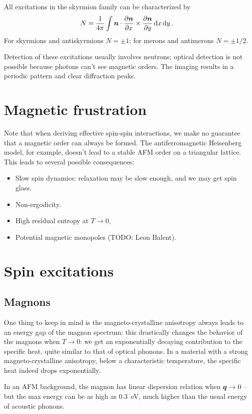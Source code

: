 \documentclass[hyperref, a4paper]{article}
\begin{document}
All excitations in the skyrmion family can be characterized by 
\begin{equation}
    N = \frac{1}{4\pi} \int \vb*{n} \cdot \pdv{\vb*{n}}{x} \times \pdv{\vb*{n}}{y} \dd{x} \dd{y}.
\end{equation}
For skyrmions and antiskyrmions $N = \pm 1$; 
for merons and antimerons $N = \pm 1/2$.

Detection of these excitations usually involves neutrons; 
optical detection is not possible 
because photons can't see magnetic orders.
The imaging results in a periodic pattern 
and clear diffraction peaks. 

\section{Magnetic frustration}

Note that when deriving effective spin-spin interactions, 
we make no guarantee that 
a magnetic order can always be formed. 
The antiferromagnetic Heisenberg model, for example, 
doesn't lead to a stable AFM order on a triangular lattice. 
This leads to several possible consequences:
\begin{itemize}
    \item Slow spin dynamics: 
        relaxation may be slow enough,
        and we may get spin glass.
    \item Non-ergodicity.
    \item High residual entropy at $T \to 0$,
    \item Potential magnetic monopoles
     (TODO: Leon Balent). 
\end{itemize}

\section{Spin excitations}

\subsection{Magnons}

One thing to keep in mind is 
the magneto-crystalline anisotropy always leads to 
an energy gap of the magnon spectrum: 
this drastically changes the behavior of the magnons 
when $T \to 0$:
we get an exponentially decaying contribution to the specific heat,
quite similar to that of optical phonons. 
In a material with a strong magneto-crystalline anisotropy,
below a characteristic temperature,
the specific heat indeed drops exponentially.

In an AFM background, 
the magnon has linear dispersion relation when $\vb*{q} \to 0$ -- 
but the max energy can be as high as \SI{0.3}{eV},
much higher than the usual energy of acoustic phonons. 
\end{document}
